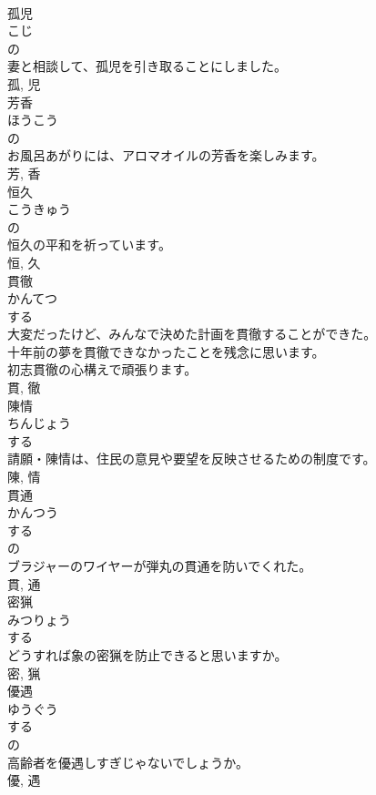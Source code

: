 \documentclass[8pt]{extreport}
\begin{document}
\begin{CJK}{UTF8}{min}
\\	孤児	
\\	こじ	
\\	の 
\\	妻と相談して、孤児を引き取ることにしました。	
\\	孤, 児	
\\	芳香	
\\	ほうこう	
\\	の 
\\	お風呂あがりには、アロマオイルの芳香を楽しみます。	
\\	芳, 香	
\\	恒久	
\\	こうきゅう	
\\	の 
\\	恒久の平和を祈っています。	
\\	恒, 久	
\\	貫徹	
\\	かんてつ	
\\	する 
\\	大変だったけど、みんなで決めた計画を貫徹することができた。	
\\	十年前の夢を貫徹できなかったことを残念に思います。	
\\	初志貫徹の心構えで頑張ります。	
\\	貫, 徹	
\\	陳情	
\\	ちんじょう	
\\	する 
\\	請願・陳情は、住民の意見や要望を反映させるための制度です。	
\\	陳, 情	
\\	貫通	
\\	かんつう	
\\	する 
\\	の 
\\	ブラジャーのワイヤーが弾丸の貫通を防いでくれた。	
\\	貫, 通	
\\	密猟	
\\	みつりょう	
\\	する 
\\	どうすれば象の密猟を防止できると思いますか。	
\\	密, 猟	
\\	優遇	
\\	ゆうぐう	
\\	する 
\\	の 
\\	高齢者を優遇しすぎじゃないでしょうか。	
\\	優, 遇	

\end{CJK}
\end{document}
